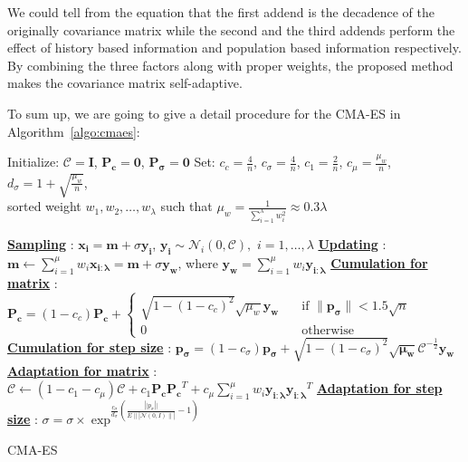           We could tell from the equation that the first addend is the
          decadence of the originally covariance matrix while the second
          and the third addends perform the effect of history based
          information and population based information respectively. By
          combining the three factors along with proper weights, the
          proposed method makes the covariance matrix self-adaptive. 

          To sum up, we are going to give a detail procedure for the
          CMA-ES in Algorithm~\ref{algo:cmaes}:

\begin{algorithm} 
  Initialize: $\mathcal{C} = \mathbf{I}$, $\mathbf{P_c} = \mathbf{0}$,
  $\mathbf{P_\sigma} = \mathbf{0}$\; Set: $c_c = \frac{4}{n}$, $c_\sigma
  = \frac{4}{n}$, $c_1 = \frac{2}{n}$, $c_\mu = \frac{\mu_w}{n}$,
  $d_\sigma = 1+\sqrt{\frac{\mu_w}{n}}$,\\sorted weight
  $w_1,w_2,\ldots,w_\lambda$ such that $\mu_w =
  \frac{1}{\sum\limits_{i=1}^\lambda w_i^2}\approx 0.3\lambda$ \;

   { \underline{\textbf{Sampling}} : $\mathbf{x_i}
  = \mathbf{m} + \sigma \mathbf{y_i}$, $\mathbf{y_i}
  \sim\mathcal{N}_i(0,\mathcal{C}),$ $i = 1,\ldots,\lambda$\;
  \underline{\textbf{Updating}} : $\mathbf{m} \leftarrow
  \sum\limits_{i=1}^\mu w_i \mathbf{x_{i:\lambda}} = \mathbf{m}+\sigma
  \mathbf{y_w}$, where $\mathbf{y_w} = \sum\limits_{i=1}^\mu w_i
  \mathbf{y_{i:\lambda}}$\; \underline{\textbf{Cumulation for matrix}}
  : $\mathbf{P_c} = (1-c_c)\mathbf{P_c}+\left\{ \begin{array}{ll}
    \sqrt{1-{\left(1-c_c\right)}^2}\sqrt{\mu_w}{\mathbf{y_w}} &
    \quad \text{if $\|\mathbf{p_{\sigma}}\| < 1.5\sqrt{n}$}\\ 0 & \quad
    \text{otherwise} \end{array}
  \right.$\; \underline{\textbf{Cumulation for step size}} :
  $\mathbf{p_{\sigma}} =
  (1-c_{\sigma})\mathbf{p_{\sigma}}+\sqrt{1-{\left(
    1-c_{\sigma}\right)}^2}\sqrt{\mathbf{\mu_w}}\mathcal{C}^{-\frac{1}{2}}\mathbf{y_w}$\;
    \underline{\textbf{Adaptation for matrix}} : $\mathcal{C} \leftarrow
    (1-c_1-c_{\mu})\mathcal{C} + c_1{\mathbf{P_c}}{\mathbf{P_c}}^T +
    c_{\mu}\sum\limits_{i=1}^{\mu}
    w_i\mathbf{y_{i:\lambda}}\mathbf{y_{i:\lambda}}^T$\;
    \underline{\textbf{Adaptation for step size}} : $\sigma = \sigma
    \times \exp^{ \frac{c_{\sigma}}{d_{\sigma}} \left(\frac{\left||
      p_{\sigma} \right||}{ E\||{\mathcal{N}(0,I)}\||} -1 \right)  }$\;
    } \caption{CMA-ES} \label{algo:cmaes}\end{algorithm}


